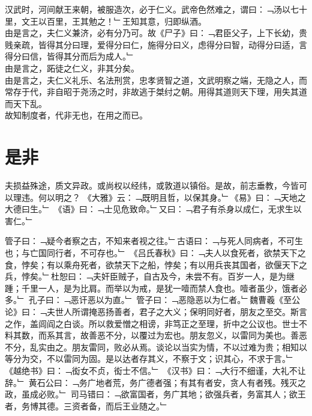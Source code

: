 {{汉武时，河间献王来朝，被服造次，必于仁义。武帝色然难之，谓曰：﹁汤以七十里，文王以百里，王其勉之！﹂王知其意，归即纵酒。\\
由是言之，夫仁义兼济，必有分乃可。故《尸子》曰：﹁君臣父子，上下长幼，贵贱亲疏，皆得其分曰理，爱得分曰仁，施得分曰义，虑得分曰智，动得分曰适，言得分曰信，皆得其分而后为成人。﹂\\
由是言之，跖徒之仁义，非其分矣。}\\
由是言之，夫仁义礼乐、名法刑赏，忠孝贤智之道，文武明察之端，无隐之人，而常存于代，非自昭于尧汤之时，非故逃于桀纣之朝。用得其道则天下理，用失其道而天下乱。
\\
故知制度者，代非无也，在用之而已。
%
%
\chapter{是非}%
夫损益殊途，质文异政。或尚权以经纬，或敦道以镇俗。是故，前志垂教，今皆可以理违。何以明之？
《大雅》云：﹁既明且哲，以保其身。﹂《易》曰：﹁天地之大德曰生。﹂
《语》曰：﹁士见危致命。﹂又曰：﹁君子有杀身以成仁，无求生以害仁。﹂}
管子曰：﹁疑今者察之古，不知来者视之往。﹂古语曰：﹁与死人同病者，不可生也；与亡国同行者，不可存也。﹂
《吕氏春秋》曰：﹁夫人以食死者，欲禁天下之食，悖矣；有以乘舟死者，欲禁天下之船，悖矣；有以用兵丧其国者，欲偃天下之兵，悖矣。﹂杜恕曰：﹁夫奸臣贼子，自古及今，未尝不有。百岁一人，是为继踵；千里一人，是为比肩。而举以为戒，是犹一噎而禁人食也。噎者虽少，饿者必多。﹂
孔子曰：﹁恶讦恶以为直。﹂
管子曰：﹁恶隐恶以为仁者。﹂魏曹羲《至公论》曰：﹁夫世人所谓掩恶扬善者，君子之大义；保明同好者，朋友之至交。斯言之作，盖闾阎之白谈。所以救爱憎之相谤，非笃正之至理，折中之公议也。世士不料其数，而系其言，故善恶不分，以覆过为宏也。朋友忽义，以雷同为美也。善恶不分，乱实由之。朋友雷同，败必从焉。谈论以当实为情，不以过难为贵；相知以等分为交，不以雷同为固。是以达者存其义，不察于文；识其心，不求于言。﹂
《越绝书》曰：﹁衒女不贞，衒士不信。﹂
《汉书》曰：﹁大行不细谨，大礼不让辞。﹂
黄石公曰：﹁务广地者荒，务广德者强；有其有者安，贪人有者残。残灭之政，虽成必败。﹂
司马错曰：﹁欲富国者，务广其地；欲强兵者，务富其人；欲王者，务博其德。三资者备，而后王业随之。﹂
